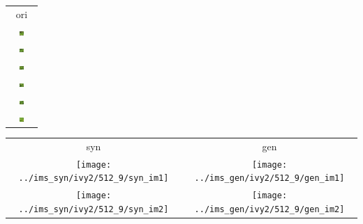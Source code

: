 \documentclass[letter]{article}
\begin{document}
\begin{table}[h!]
	\centering
	\begin{tabular}{c}
		ori\tabularnewline
		\includegraphics[width=0.17\textwidth]{../data/ivy2/512/1} \tabularnewline		\includegraphics[width=0.17\textwidth]{../data/ivy2/512/2} \tabularnewline		\includegraphics[width=0.17\textwidth]{../data/ivy2/512/3} \tabularnewline		\includegraphics[width=0.17\textwidth]{../data/ivy2/512/4} \tabularnewline		\includegraphics[width=0.17\textwidth]{../data/ivy2/512/5} \tabularnewline		\includegraphics[width=0.17\textwidth]{../data/ivy2/512/6} \tabularnewline
	\end{tabular}
	\begin{tabular}{cc}
		syn & gen\tabularnewline
		\texttt{[image: ../ims\_syn/ivy2/512\_9/syn\_im1]} & \texttt{[image: ../ims\_gen/ivy2/512\_9/gen\_im1]} \tabularnewline
		\texttt{[image: ../ims\_syn/ivy2/512\_9/syn\_im2]} & \texttt{[image: ../ims\_gen/ivy2/512\_9/gen\_im2]} \tabularnewline

\end{tabular}
\end{table}
\end{document}
